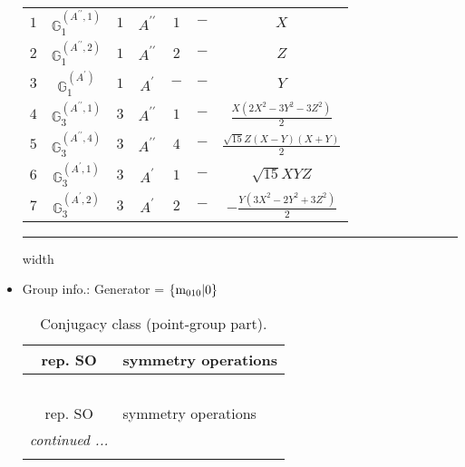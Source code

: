 \documentclass[fleqn,10pt,landscape]{article}
\begin{document}
\begin{itemize}
\begin{center}
\begin{longtable}{ccccccc}
$ 1 $ & $ \mathbb{G}_{1}^{(A^{\prime\prime},1)} $ & $ 1 $ & $ A^{\prime\prime} $ & $ 1 $ & $ - $ & $ X $ \\
$ 2 $ & $ \mathbb{G}_{1}^{(A^{\prime\prime},2)} $ & $ 1 $ & $ A^{\prime\prime} $ & $ 2 $ & $ - $ & $ Z $ \\
$ 3 $ & $ \mathbb{G}_{1}^{(A^{\prime})} $ & $ 1 $ & $ A^{\prime} $ & $ - $ & $ - $ & $ Y $ \\ \hline
$ 4 $ & $ \mathbb{G}_{3}^{(A^{\prime\prime},1)} $ & $ 3 $ & $ A^{\prime\prime} $ & $ 1 $ & $ - $ & $ \frac{X \left(2 X^{2} - 3 Y^{2} - 3 Z^{2}\right)}{2} $ \\
$ 5 $ & $ \mathbb{G}_{3}^{(A^{\prime\prime},4)} $ & $ 3 $ & $ A^{\prime\prime} $ & $ 4 $ & $ - $ & $ \frac{\sqrt{15} Z \left(X - Y\right) \left(X + Y\right)}{2} $ \\
$ 6 $ & $ \mathbb{G}_{3}^{(A^{\prime},1)} $ & $ 3 $ & $ A^{\prime} $ & $ 1 $ & $ - $ & $ \sqrt{15} X Y Z $ \\
$ 7 $ & $ \mathbb{G}_{3}^{(A^{\prime},2)} $ & $ 3 $ & $ A^{\prime} $ & $ 2 $ & $ - $ & $ - \frac{Y \left(3 X^{2} - 2 Y^{2} + 3 Z^{2}\right)}{2} $ \\
\end{longtable}
\end{center}

 \hfil \hrule height 1mm width \textwidth \hfil

\item Group info.: Generator = $\{{\rm m}_{010}|0\}$

\begin{center}
\renewcommand{\arraystretch}{1.3}
\begin{longtable}{c|l}
\caption{Conjugacy class (point-group part).}
 \\
 \hline \hline
rep. SO & symmetry operations \\ \hline \endfirsthead

\multicolumn{1}{l}{\tablename\ \thetable{}} \\
 \hline \hline
rep. SO & symmetry operations \\ \hline \endhead

 \hline \hline
\multicolumn{1}{r}{\footnotesize\it continued ...} \\ \endfoot


\end{longtable}
\end{center}
\end{itemize}
\end{document}
